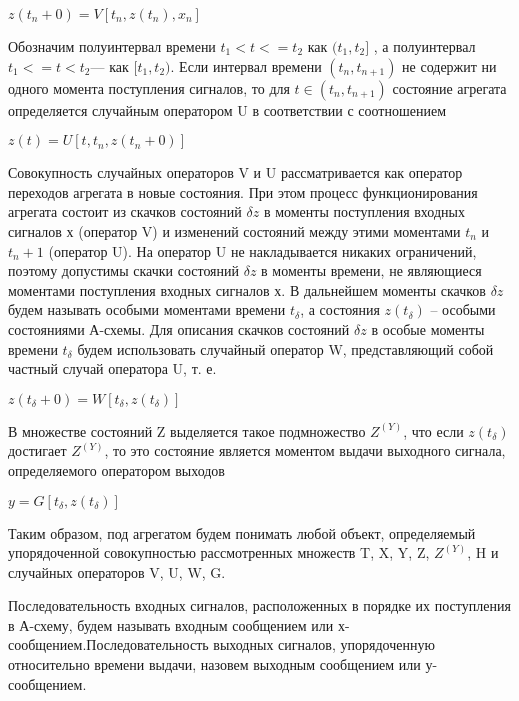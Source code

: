   \begin{center}
    $z(t_{n} + 0) = V[t_{n}, z(t_{n}), x_{n}]$
  \end{center}

  Обозначим полуинтервал времени $t_{1} < t <= t_{2}$ как $(t_{1}, t_{2}]$ , а полуинтервал $t_{1} <= t < t_{2}$— как $[t_{1}, t_{2})$. Если интервал времени $(t_{n}, t_{n + 1})$ не содержит ни одного момента поступления сигналов, то для $t \in (t_{n}, t_{n + 1})$ состояние агрегата определяется случайным оператором U в соответствии с соотношением

  \begin{center} $z(t) = U[t, t_{n}, z(t_{n} + 0)]$
  \end{center}

  Совокупность случайных операторов V и U рассматривается как оператор переходов агрегата в новые состояния. При этом процесс функционирования агрегата состоит из скачков состояний $\delta z$ в моменты поступления входных сигналов х (оператор V) и изменений состояний между этими моментами $t_{n}$ и $t_{n} + 1$ (оператор U). На оператор U не накладывается никаких ограничений, поэтому допустимы скачки состояний $\delta z$ в моменты времени, не являющиеся моментами поступления входных сигналов х. В дальнейшем моменты скачков $\delta z$ будем называть особыми моментами времени $t_{\delta}$, а состояния $z(t_{\delta})$ -- особыми состояниями А-схемы. Для описания скачков состояний $\delta z$ в особые моменты времени $t_{\delta}$ будем использовать случайный оператор W, представляющий собой частный случай оператора U, т. е.
  \begin{center}
    $z(t_{\delta} + 0) = W[t_{\delta}, z(t_{\delta})]$
  \end{center}

  В множестве состояний Z выделяется такое подмножество $Z^{(Y)}$, что если $z(t_{\delta})$ достигает $Z^{(Y)}$, то это состояние является моментом выдачи выходного сигнала, определяемого оператором выходов

  \begin{center}
    $y = G[t_{\delta}, z(t_{\delta})]$
  \end{center}

  Таким образом, под агрегатом будем понимать любой объект, определяемый упорядоченной совокупностью рассмотренных множеств T, X, Y, Z, $Z^{(Y)}$, H и случайных операторов V, U, W, G.

  Последовательность входных сигналов, расположенных в порядке их поступления в А-схему, будем называть входным сообщением или х-сообщением.Последовательность выходных сигналов, упорядоченную относительно времени выдачи, назовем выходным сообщением или у-сообщением.


